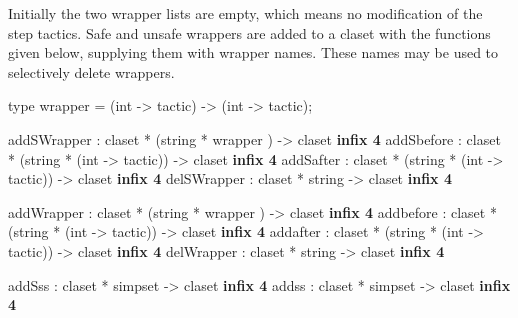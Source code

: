 Initially the two wrapper lists are empty, which means no modification of the
step tactics. Safe and unsafe wrappers are added to a claset 
with the functions given below, supplying them with wrapper names. 
These names may be used to selectively delete wrappers.

\begin{ttbox} 
type wrapper = (int -> tactic) -> (int -> tactic);

addSWrapper  : claset * (string *  wrapper       ) -> claset \hfill{\bf infix 4}
addSbefore   : claset * (string * (int -> tactic)) -> claset \hfill{\bf infix 4}
addSafter    : claset * (string * (int -> tactic)) -> claset \hfill{\bf infix 4}
delSWrapper  : claset *  string                    -> claset \hfill{\bf infix 4}

addWrapper   : claset * (string *  wrapper       ) -> claset \hfill{\bf infix 4}
addbefore    : claset * (string * (int -> tactic)) -> claset \hfill{\bf infix 4}
addafter     : claset * (string * (int -> tactic)) -> claset \hfill{\bf infix 4}
delWrapper   : claset *  string                    -> claset \hfill{\bf infix 4}

addSss       : claset * simpset -> claset                 \hfill{\bf infix 4}
addss        : claset * simpset -> claset                 \hfill{\bf infix 4}
\end{ttbox}
%

